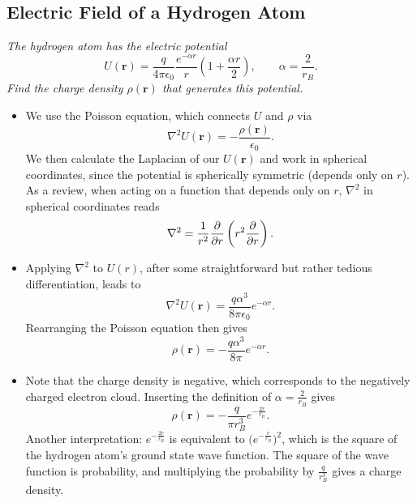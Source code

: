 \documentclass[11pt, a4paper]{article}
\renewcommand{\vec}[1]{\bm{#1}} %
\renewcommand{\r}{\vec{r}}
\newcommand{\ee}{\epsilon_{0}}  %
\begin{document}
\subsection{Electric Field of a Hydrogen Atom}
\textit{The hydrogen atom has the electric potential}
\begin{equation*}
	U(\r) = \frac{q}{4\pi \ee} \frac{e^{-\alpha r}}{r}\left(1 + \frac{\alpha r}{2}\right), \qquad \alpha = \frac{2}{r_{B}}.
\end{equation*}
\textit{Find the charge density $ \rho(\r) $ that generates this potential.}
\begin{itemize}
	\item We use the Poisson equation, which connects $ U $ and $ \rho $ via
	\begin{equation*}
		\nabla^{2}U(\r) = - \frac{\rho(\r)}{\ee}.
	\end{equation*}
	We then calculate the Laplacian of our $ U(\r) $ and work in spherical coordinates, since the potential is spherically symmetric (depends only on $ r $). As a review, when acting on a function that depends only on $ r $, $ \nabla^{2} $ in spherical coordinates reads
	\begin{equation*}
		\nabla^{2} = \frac{1}{r^{2}} \pdv{}{r}\left(r^{2} \pdv{}{r}\right).
	\end{equation*}
	
	\item Applying $ \nabla^{2} $ to $ U(r) $, after some straightforward but rather tedious differentiation, leads to
	\begin{equation*}
		\nabla^{2}U(\r) = \frac{q\alpha^{3}}{8 \pi \ee}e^{-\alpha r}.
	\end{equation*}
	Rearranging the Poisson equation then gives
	\begin{equation*}
		\rho(\r) = - \frac{q\alpha^{3}}{8 \pi}e^{-\alpha r}.
	\end{equation*}
	
	\item Note that the charge density is negative, which corresponds to the negatively charged electron cloud. Inserting the definition of $ \alpha = \frac{2}{r_{B}}$ gives
	\begin{equation*}
		\rho(\r) = -\frac{q}{\pi r_{B}^{3}} e^{-\frac{2r}{r_{B}}}.
	\end{equation*}
	Another interpretation: $ e^{-\frac{2r}{r_{B}}} $ is equivalent to $ \big(e^{-\frac{r}{r_{B}}}\big)^{2} $, which is the square of the hydrogen atom's ground state wave function. The square of the wave function is probability, and multiplying the probability by $ \frac{q}{r_{B}^{3}} $ gives a charge density. 
	

\end{itemize}
\end{document}
